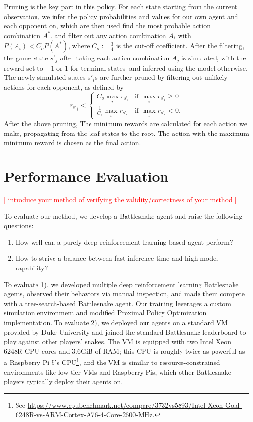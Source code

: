 \documentclass[conference]{IEEEtran}
\newcommand{\todo}[1]{\textcolor{red}{[ #1 ]}}
\begin{document}
Pruning is the key part in this policy.
For each state starting from the current observation,
we infer the policy probabilities and values for our own agent and each opponent
on, which are then used find the most probable action combination $A^\ast$,
and filter out any action combination $A_i$ with $P(A_i)<C_oP(A^\ast)$,
where $C_o:=\frac{3}{4}$ is the cut-off coefficient.
After the filtering,
the game state $s'_j$ after taking each action combination $A_j$ is simulated,
with the reward set to $-1$ or $1$ for terminal states,
and inferred using the model otherwise.
The newly simulated states $s'_i$s are further pruned by filtering out unlikely
actions for each opponent, as defined by
$$
    r_{s'_j} < \begin{cases}
        C_o\max_i r_{s'_i}           & \text{if } \max_i r_{s'_i} \ge 0 \\
        \frac{1}{C_o}\max_i r_{s'_i} & \text{if } \max_i r_{s'_i} < 0.
    \end{cases}
$$
After the above pruning,
The minimum rewards are calculated for each action we make,
propagating from the leaf states to the root.
The action with the maximum minimum reward is chosen as the final action.

\section{Performance Evaluation}

\todo{introduce your method of verifying the validity/correctness of your method}

To evaluate our method, we develop a Battlesnake agent and raise the following questions:
\begin{enumerate}
    \item How well can a purely deep-reinforcement-learning-based agent perform?
    \item How to strive a balance between fast inference time and high model capability?
\end{enumerate}

To evaluate 1),
we developed multiple deep reinforcement learning Battlesnake agents,
observed their behaviors via manual inspection,
and made them compete with a tree-search-based Battlesnake agent.
Our training leverages a custom simulation environment and modified Proximal
Policy Optimization implementation. To evaluate 2),
we deployed our agents on a standard VM provided by Duke University and joined
the standard Battlesnake leaderboard to play against other players' snakes.
The VM is equipped with two Intel Xeon 6248R CPU cores and 3.6GiB of RAM;
this CPU is roughly twice as powerful as a Raspberry Pi 5's CPU\footnote{See
    \url{https://www.cpubenchmark.net/compare/3732vs5893/Intel-Xeon-Gold-6248R-vs-ARM-Cortex-A76-4-Core-2600-MHz}.
},
and the VM is similar to resource-constrained environments like low-tier VMs and
Raspberry Pis, which other Battlesnake players typically deploy their agents on.
\end{document}
